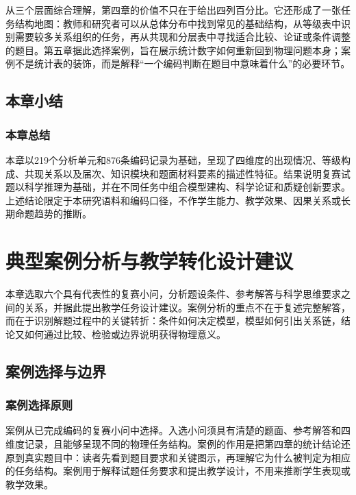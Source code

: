 \documentclass[
  12pt,
  a4paper]{ctexbook}
\begin{document}
从三个层面综合理解，第四章的价值不只在于给出四列百分比。它还形成了一张任务结构地图：教师和研究者可以从总体分布中找到常见的基础结构，从等级表中识别需要较多关系组织的任务，再从共现和分层表中寻找适合比较、论证或条件调整的题目。第五章据此选择案例，旨在展示统计数字如何重新回到物理问题本身；案例不是统计表的装饰，而是解释``一个编码判断在题目中意味着什么''的必要环节。

\enlargethispage{3\baselineskip}

\section{本章小结}\label{ux672cux7ae0ux5c0fux7ed3-3}

\subsection{本章总结}\label{ux672cux7ae0ux603bux7ed3-3}

本章以219个分析单元和876条编码记录为基础，呈现了四维度的出现情况、等级构成、共现关系以及届次、知识模块和题面材料要素的描述性特征。结果说明复赛试题以科学推理为基础，并在不同任务中组合模型建构、科学论证和质疑创新要求。上述结论限定于本研究语料和编码口径，不作学生能力、教学效果、因果关系或长期命题趋势的推断。

\chapter{典型案例分析与教学转化设计建议}\label{ux5178ux578bux6848ux4f8bux5206ux6790ux4e0eux6559ux5b66ux8f6cux5316ux8bbeux8ba1ux5efaux8bae}

本章选取六个具有代表性的复赛小问，分析题设条件、参考解答与科学思维要求之间的关系，并据此提出教学任务设计建议。案例分析的重点不在于复述完整解答，而在于识别解题过程中的关键转折：条件如何决定模型，模型如何引出关系链，结论又如何通过比较、检验或边界说明获得物理意义。

\section{案例选择与边界}\label{ux6848ux4f8bux9009ux62e9ux4e0eux8fb9ux754c}

\subsection{案例选择原则}\label{ux6848ux4f8bux9009ux62e9ux539fux5219}

案例从已完成编码的复赛小问中选择。入选小问须具有清楚的题面、参考解答和四维度记录，且能够呈现不同的物理任务结构。案例的作用是把第四章的统计结论还原到真实题目中：读者先看到题目要求和关键图示，再理解它为什么被判定为相应的任务结构。案例用于解释试题任务要求和提出教学设计，不用来推断学生表现或教学效果。
\end{document}
